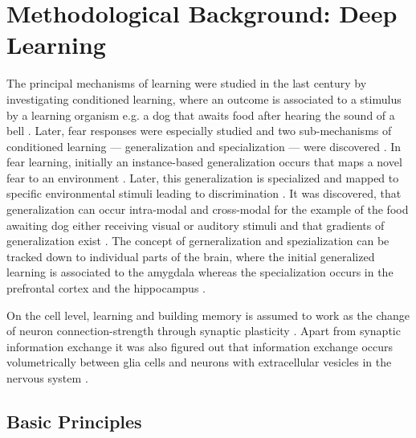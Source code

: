 \section{Methodological Background: Deep Learning} %
    \label{sec:deep_learning}
    The principal mechanisms of learning were studied in the last century by investigating conditioned learning, where an outcome is associated to a stimulus by a learning organism e.g. a dog that awaits food after hearing the sound of a bell \citep{pavlov1928conditioned, pavlov2010conditioned, banich2011generalization}. Later, fear responses were especially studied and two sub-mechanisms of conditioned learning --- generalization and specialization --- were discovered \citep{banich2011generalization}.
    In fear learning, initially an instance-based generalization occurs that maps a novel fear to an environment \citep{banich2011generalization}. Later, this generalization is specialized and mapped to specific environmental stimuli leading to discrimination \citep{banich2011generalization}.
    It was discovered, that generalization can occur intra-modal and cross-modal for the example of the food awaiting dog either receiving visual or auditory stimuli \citep{pavlov1928conditioned} and that gradients of generalization exist \citep{guttman1956discriminability}.
    The concept of gerneralization and spezialization can be tracked down to individual parts of the brain, where the initial generalized learning is associated to the amygdala whereas the specialization occurs in the prefrontal cortex and the hippocampus \citep{banich2011generalization}.

    On the cell level, learning and building memory is assumed to work as the change of neuron connection-strength through synaptic plasticity \citep{do1949organization,martin2000synaptic}. Apart from synaptic information exchange it was also figured out that information exchange occurs volumetrically between glia cells and neurons with extracellular vesicles in the nervous system \citep{schiera2019communcation}.

    \subsection{Basic Principles} %

